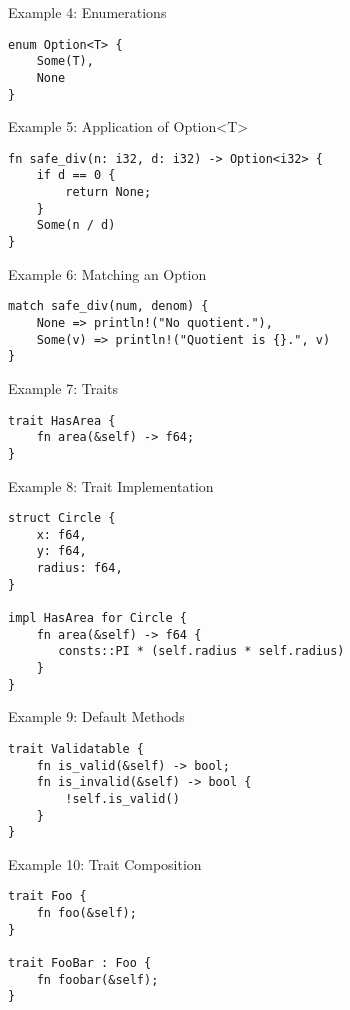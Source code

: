 
\begin{frame}[fragile]{Example 4: Enumerations}
\begin{verbatim}
enum Option<T> {
    Some(T),
    None
}
\end{verbatim}
\end{frame}


\begin{frame}[fragile]{Example 5: Application of Option<T>}
\begin{verbatim}
fn safe_div(n: i32, d: i32) -> Option<i32> {
    if d == 0 {
        return None;
    }
    Some(n / d)
}
\end{verbatim}
\end{frame}


\begin{frame}[fragile]{Example 6: Matching an Option}
\begin{verbatim}
match safe_div(num, denom) {
    None => println!("No quotient."),
    Some(v) => println!("Quotient is {}.", v)
}
\end{verbatim}
\end{frame}


\begin{frame}[fragile]{Example 7: Traits}
\begin{verbatim}
trait HasArea {
    fn area(&self) -> f64;
}
\end{verbatim}
\end{frame}


\begin{frame}[fragile]{Example 8: Trait Implementation}
\begin{verbatim}
struct Circle {
    x: f64,
    y: f64,
    radius: f64,
}

impl HasArea for Circle {
    fn area(&self) -> f64 {
       consts::PI * (self.radius * self.radius)
    }
}
\end{verbatim}
\end{frame}


\begin{frame}[fragile]{Example 9: Default Methods}
\begin{verbatim}
trait Validatable {
    fn is_valid(&self) -> bool;
    fn is_invalid(&self) -> bool {
        !self.is_valid()
    }
}
\end{verbatim}
\end{frame}


\begin{frame}[fragile]{Example 10: Trait Composition}
\begin{verbatim}
trait Foo {
    fn foo(&self);
}

trait FooBar : Foo {
    fn foobar(&self);
}
\end{verbatim}
\end{frame}
